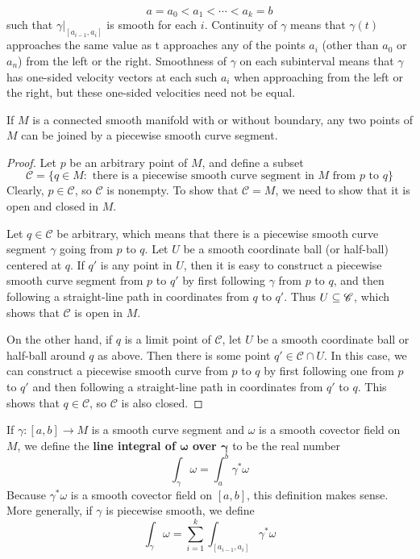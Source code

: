 \[a=a_0<a_1<\cdots<a_k=b\]
such that $\gamma|_{[a_{i-1},a_i]}$ is smooth for each $i$. Continuity of $\gamma$ means that $\gamma(t)$ approaches the same value as t approaches any of the points $a_i$ (other than $a_0$ or $a_n$) from the left or the right. Smoothness of $\gamma$ on each subinterval means that $\gamma$ has one-sided velocity vectors at each such $a_i$ when approaching from the left or the right, but these one-sided velocities need not be equal.
\begin{proposition}\label{connect by smooth curve}
If $M$ is a connected smooth manifold with or without boundary, any two points of $M$ can be joined by a piecewise smooth curve segment.
\end{proposition}
\begin{proof}
Let $p$ be an arbitrary point of $M$, and define a subset
\[\mathscr{C}=\{q\in M:\text{ there is a piecewise smooth curve segment in $M$ from $p$ to $q$}\}\]
Clearly, $p\in\mathscr{C}$, so $\mathscr{C}$ is nonempty. To show that $\mathscr{C}=M$, we need to show that it is open and closed in $M$.\par
Let $q\in \mathscr{C}$ be arbitrary, which means that there is a piecewise smooth curve segment $\gamma$ going from $p$ to $q$. Let $U$ be a smooth coordinate ball (or half-ball) centered at $q$. If $q'$ is any point in $U$, then it is easy to construct a piecewise smooth curve segment from $p$ to $q'$ by first following $\gamma$ from $p$ to $q$, and then following a straight-line
path in coordinates from $q$ to $q'$. Thus $U\subseteq\mathscr{C}$, which shows that $\mathscr{C}$ is open in $M$.\par
On the other hand, if $q$ is a limit point of $\mathscr{C}$, let $U$ be a smooth coordinate ball or half-ball around $q$ as above. Then there is some point $q'\in\mathscr{C}\cap U$. In this case, we can construct a piecewise smooth curve from $p$ to $q$ by first following one from $p$ to $q'$ and then following a straight-line path in coordinates from $q'$ to $q$. This shows that $q\in\mathscr{C}$, so $\mathscr{C}$ is also closed.
\end{proof}
If $\gamma:[a,b]\to M$ is a smooth curve segment and $\omega$ is a smooth covector field on $M$, we define the \textbf{line integral of $\bm{\omega}$ over $\bm{\gamma}$} to be the real number
\[\int_{\gamma}\omega=\int_{a}^{b}\gamma^*\omega\]
Because $\gamma^*\omega$ is a smooth covector field on $[a,b]$, this definition makes sense. More generally, if $\gamma$ is piecewise smooth, we define
\[\int_{\gamma}\omega=\sum_{i=1}^{k}\int_{[a_{i-1},a_i]}\gamma^*\omega\]
